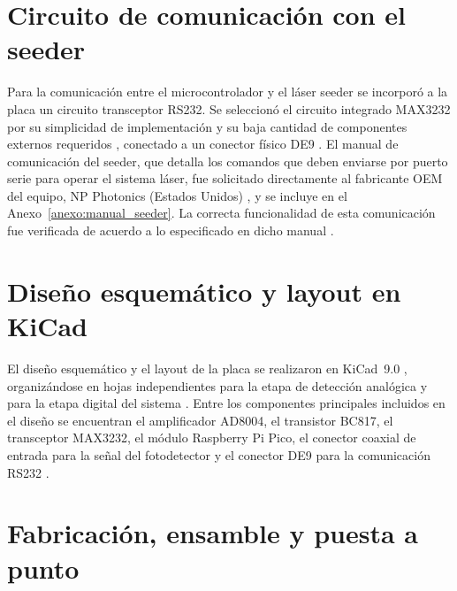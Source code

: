 
\section{Circuito de comunicaci\'on con el seeder}
\label{sec:comunicacion_seeder}

Para la comunicaci\'on entre el microcontrolador y el l\'aser seeder se
incorpor\'o a la placa un circuito transceptor RS232. Se seleccion\'o el
circuito integrado MAX3232 por su simplicidad de implementaci\'on y su
baja cantidad de componentes externos requeridos
\cite{informeMarzo2026}, conectado a un conector f\'isico DE9
\cite{kicad_hsrl}. El manual de comunicaci\'on del seeder, que detalla
los comandos que deben enviarse por puerto serie para operar el sistema
l\'aser, fue solicitado directamente al fabricante OEM del equipo, NP
Photonics (Estados Unidos) \cite{informeMarzo2026}, y se incluye en el
Anexo~\ref{anexo:manual_seeder}. La correcta funcionalidad de esta
comunicaci\'on fue verificada de acuerdo a lo especificado en dicho
manual \cite{informeAbril2026}.

\section{Dise\~no esquem\'atico y layout en KiCad}
\label{sec:esquematico_layout}

El dise\~no esquem\'atico y el layout de la placa se realizaron en
KiCad~9.0 \cite{informeMarzo2026}, organiz\'andose en hojas
independientes para la etapa de detecci\'on anal\'ogica y para la etapa
digital del sistema \cite{kicad_hsrl}. Entre los componentes principales
incluidos en el dise\~no se encuentran el amplificador AD8004, el
transistor BC817, el transceptor MAX3232, el m\'odulo Raspberry Pi Pico,
el conector coaxial de entrada para la se\~nal del fotodetector y el
conector DE9 para la comunicaci\'on RS232 \cite{kicad_hsrl}.


\section{Fabricaci\'on, ensamble y puesta a punto}
\label{sec:fabricacion_ensamble}


